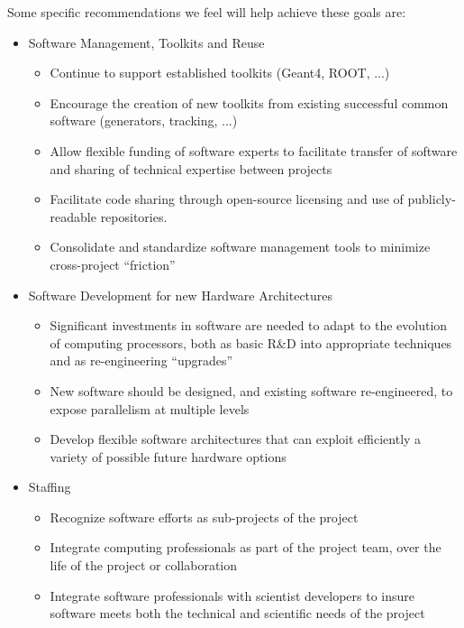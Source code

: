 Some specific recommendations we feel will help achieve these goals are:

\begin{itemize}
    \item Software Management, Toolkits and Reuse
    \begin{itemize}
        \item Continue to support established toolkits (Geant4, ROOT, ...)
        \item Encourage the creation of new toolkits from existing successful common software (generators, tracking, ...)
        \item  Allow flexible funding of software experts to facilitate transfer of software and sharing of technical expertise between projects
        \item Facilitate code sharing through open-source licensing and use of publicly-readable repositories.
        \item Consolidate and standardize software management tools to minimize cross-project ``friction''
    \end{itemize}

    \item Software Development for new Hardware Architectures
    \begin{itemize}
        \item Significant investments in software are needed to adapt to the evolution of computing processors, both as basic R\&D into appropriate
techniques and as re-engineering ``upgrades''
        \item New software should be designed, and existing software re-engineered, to expose parallelism at multiple levels
        \item Develop flexible software architectures that can exploit efficiently a variety of possible future hardware options
    \end{itemize}    

    \item Staffing
      \begin{itemize}
          \item Recognize software efforts as sub-projects of the project
          \item Integrate computing professionals as part of the project team, over the life of the project or collaboration
          \item Integrate software professionals with scientist developers to insure software meets both the technical and scientific needs of the project
      \end{itemize}


\end{itemize}
